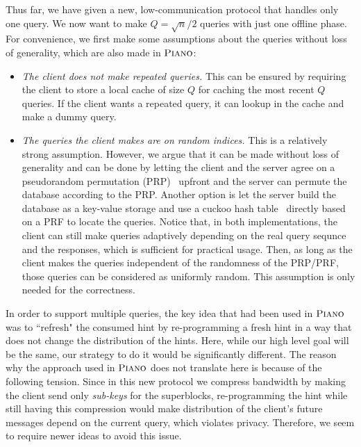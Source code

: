 Thus far, we have
given a new, low-communication protocol that handles only one query. We now want
to make $Q=\sqrt{n}/2$ queries with just one offline phase. For convenience, we
first make some assumptions about the queries without loss of generality, which
are also made in $\textsc{Piano}$:
\begin{itemize}
    \item \textit{The client does not make repeated queries.} This can be ensured 
    by requiring the client to store a local cache of size $Q$ for caching the
    most recent $Q$ queries. If the client wants a repeated query, it can lookup
    in the cache and make a dummy query.
    
    \item \textit{The queries the client makes are on random indices.} This is a relatively
    strong assumption. However, we argue that it can be made without loss of
    generality and can be done by letting the client and the server agree on a
    pseudorandom permutation (PRP)~\cite{prp1,prp2} upfront and the server can
    permute the database according to the PRP. Another option is let the server
    build the database as a key-value storage and use a cuckoo hash
    table~\cite{cuckoo1,cuckoo2} directly based on a PRF to locate the queries.
    Notice that, in both implementations, the client can still make queries
    adaptively depending on the real query sequnce and the responses, which is
    sufficient for practical usage. Then, as long as the client makes the
    queries independent of the randomness of the PRP/PRF, those queries can be
    considered as uniformly random. This assumption is only needed for the
    correctness.
\end{itemize}

In order to support multiple queries, the key idea that had been used in
$\textsc{Piano}$ was to ``refresh" the consumed hint by re-programming a fresh hint in a
way that does not change the distribution of the hints. Here, while our high
level goal will be the same, our strategy to do it would be significantly
different. The reason why the approach used in $\textsc{Piano}$ does not translate here
is because of the following tension. Since in this new protocol we compress
bandwidth by making the client send only \emph{sub-keys} for the superblocks,
re-programming the hint while still having this compression would make
distribution of the client's future messages depend on the current query, which
violates privacy. Therefore, we seem to require newer ideas to avoid this issue.


